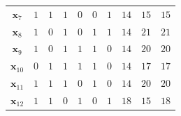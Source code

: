 \begin{table}[!htbp]
\begin{tabular}{cccccccccc}
		$\textbf{x}_{7}$	&	$1$	&	$1$	&	$1$	&	$0$	&	$0$	&	$1$	&	$14$	&	$15$	&	$15$	\\
		$\textbf{x}_{8}$	&	$1$	&	$0$	&	$1$	&	$0$	&	$1$	&	$1$	&	$14$	&	$21$	&	$21$	\\
		$\textbf{x}_{9}$	&	$1$	&	$0$	&	$1$	&	$1$	&	$1$	&	$0$	&	$14$	&	$20$	&	$20$	\\
		$\textbf{x}_{10}$	&	$0$	&	$1$	&	$1$	&	$1$	&	$1$	&	$0$	&	$14$	&	$17$	&	$17$	\\
		$\textbf{x}_{11}$	&	$1$	&	$1$	&	$1$	&	$0$	&	$1$	&	$0$	&	$14$	&	$20$	&	$20$	\\
		$\textbf{x}_{12}$	&	$1$	&	$1$	&	$0$	&	$1$	&	$0$	&	$1$	&	$18$	&	$15$	&	$18$	\\
		\hline
	\end{tabular}
\end{table}

